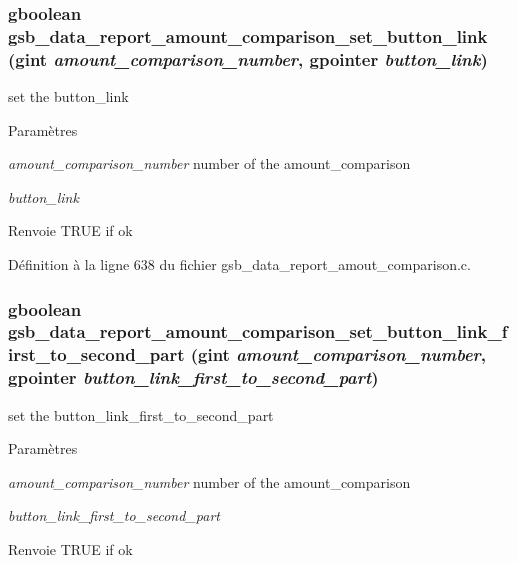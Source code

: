\subsubsection[{gsb\_\-data\_\-report\_\-amount\_\-comparison\_\-set\_\-button\_\-link}]{\setlength{\rightskip}{0pt plus 5cm}gboolean gsb\_\-data\_\-report\_\-amount\_\-comparison\_\-set\_\-button\_\-link (gint {\em amount\_\-comparison\_\-number}, \/  gpointer {\em button\_\-link})}\label{gsb__data__report__amout__comparison_8h_a7c3f11144facc579886947e46cce5e4f}
set the button\_\-link


\begin{DoxyParams}{Paramètres}
\item[{\em amount\_\-comparison\_\-number}]number of the amount\_\-comparison \item[{\em button\_\-link}]\end{DoxyParams}
\begin{DoxyReturn}{Renvoie}
TRUE if ok 
\end{DoxyReturn}


Définition à la ligne 638 du fichier gsb\_\-data\_\-report\_\-amout\_\-comparison.c.

\subsubsection[{gsb\_\-data\_\-report\_\-amount\_\-comparison\_\-set\_\-button\_\-link\_\-first\_\-to\_\-second\_\-part}]{\setlength{\rightskip}{0pt plus 5cm}gboolean gsb\_\-data\_\-report\_\-amount\_\-comparison\_\-set\_\-button\_\-link\_\-first\_\-to\_\-second\_\-part (gint {\em amount\_\-comparison\_\-number}, \/  gpointer {\em button\_\-link\_\-first\_\-to\_\-second\_\-part})}\label{gsb__data__report__amout__comparison_8h_a087486603c2aee80b31256fde7a544b1}
set the button\_\-link\_\-first\_\-to\_\-second\_\-part


\begin{DoxyParams}{Paramètres}
\item[{\em amount\_\-comparison\_\-number}]number of the amount\_\-comparison \item[{\em button\_\-link\_\-first\_\-to\_\-second\_\-part}]\end{DoxyParams}
\begin{DoxyReturn}{Renvoie}
TRUE if ok 
\end{DoxyReturn}


